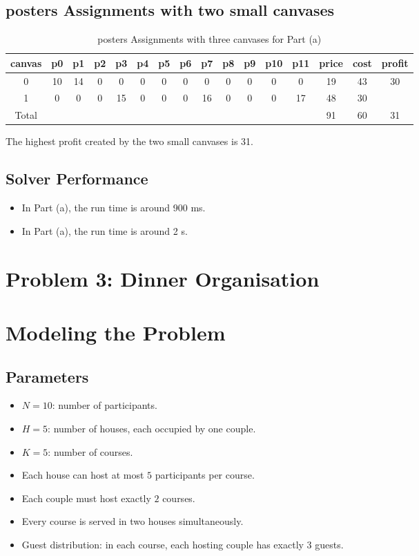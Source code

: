 \documentclass{article}
\begin{document}
\subsection{posters Assignments with two small canvases}

\begin{table}[H]
\centering
\caption{posters Assignments with three canvases for Part (a)}
\small
\begin{tabular}{c|cccccccccccc|c|c|c}
\toprule
canvas & p0 & p1 & p2 & p3 & p4  & p5 & p6 & p7 & p8 & p9 & p10 & p11 & price & cost & profit\\
\midrule
0 & 10 & 14 & 0 & 0 & 0 & 0 & 0 & 0 & 0 & 0 & 0 & 0 & 19 & 43 & 30\\
1 & 0 & 0 & 0 & 15 & 0 & 0 & 0 & 16 & 0 & 0 & 0 & 17 & 48 & 30 &\\
\midrule
Total & & & & & & & & & & & & & 91 & 60 & 31\\
\bottomrule
\end{tabular}
\end{table}
The highest profit created by the two small canvases is 31.

\subsection{Solver Performance}

\begin{itemize}
    \item    
    In Part (a), the run time is around 900 ms.
    \item 
    In Part (a), the run time is around 2 s.
\end{itemize}


\setcounter{section}{0}
\section*{Problem 3: Dinner Organisation}

\section{Modeling the Problem}

\subsection{Parameters}
\begin{itemize}
  \item $N = 10$: number of participants.
  \item $H = 5$: number of houses, each occupied by one couple.
  \item $K = 5$: number of courses.
  \item Each house can host at most $5$ participants per course.
  \item Each couple must host exactly $2$ courses.
  \item Every course is served in two houses simultaneously.
  \item Guest distribution: in each course, each hosting couple has exactly 3 guests.
\end{itemize}
\end{document}
